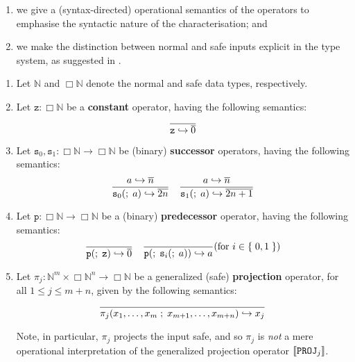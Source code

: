\begin{enumerate}[label=(\arabic*)]

\item we give a (syntax-directed) operational semantics of the operators to
emphasise the syntactic nature of the characterisation; and

\item we make the distinction between normal and safe inputs explicit in the
type system, as suggested in \cite[\textsection\ 5]{bellantoni-cook-1992}.

\end{enumerate}

\begin{definition} \cite{bellantoni-cook-1992}

\begin{enumerate}[label=(\arabic*)]

\item Let $\mathbb{N}$ and $\Box\mathbb{N}$ denote the normal and safe data
types, respectively.

\item Let $\mathtt{z} : \Box\mathbb{N}$ be a \textbf{constant} operator, having
the following semantics:$$
%
\axiom{ \mathtt{z} \goesto \repr{0} }
%
$$

\item Let $\mathtt{s}_0,\mathtt{s}_1 : \Box\mathbb{N} \rightarrow
\Box\mathbb{N}$ be (binary) \textbf{successor} operators, having the following
semantics:$$
%
\judgement{ a \goesto \repr{n} }{
%
  \mathtt{s}_0\p{\semic{} a} \goesto \repr{2n}
%
} \quad
%
\judgement{ a \goesto \repr{n} }{
%
  \mathtt{s}_1\p{\semic{} a} \goesto \repr{2n + 1}
%
}
%
$$

\item Let $\mathtt{p} : \Box\mathbb{N} \rightarrow \Box\mathbb{N}$ be a
(binary) \textbf{predecessor} operator, having the following semantics: $$
%
\axiom{
%
  \mathtt{p}\p{\semic{} \mathtt{z}} \goesto \repr{0}
%
}
%
\quad\axiom{
%
  \mathtt{p}\p{\semic{} \mathtt{s}_i\p{\semic{} a}} \goesto a
%
}\p{\text{for $i \in \set{0,1}$}}
%
$$

\item Let $\pi_j : \mathbb{N}^m \times \Box\mathbb{N}^n \rightarrow
\Box\mathbb{N}$ be a generalized (safe) \textbf{projection} operator, for all
$1 \leq j \leq m+n$, given by the following semantics:$$
%
\axiom{ \pi_j\p{x_1,\ldots,x_m \semic{} x_{m+1},\ldots,x_{m+n}} \goesto x_j }
%
$$

Note, in particular, $\pi_j$ projects the input safe, and so $\pi_j$ is
\emph{not} a mere operational interpretation of the generalized projection
operator ${\mathopen{}\left\llbracket{\mathtt{PROJ}_j}\right\rrbracket\mathclose{}}$.


\end{enumerate}
\end{definition}
